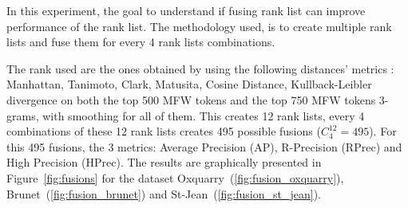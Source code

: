 In this experiment, the goal to understand if fusing rank list can improve performance of the rank list.
The methodology used, is to create multiple rank lists and fuse them for every 4 rank lists combinations.

The rank used are the ones obtained by using the following distances' metrics : Manhattan, Tanimoto, Clark, Matusita, Cosine Distance, Kullback-Leibler divergence on both the top 500 MFW tokens and the top 750 MFW tokens 3-grams, with smoothing for all of them.
This creates 12 rank lists, every 4 combinations of these 12 rank lists creates 495 possible fusions ($C^{12}_{4} = 495$).
For this 495 fusions, the 3 metrics: Average Precision (AP), R-Precision (RPrec) and High Precision (HPrec).
The results are graphically presented in Figure~\ref{fig:fusions} for the dataset Oxquarry~(\ref{fig:fusion_oxquarry}), Brunet~(\ref{fig:fusion_brunet}) and St-Jean~(\ref{fig:fusion_st_jean}).

